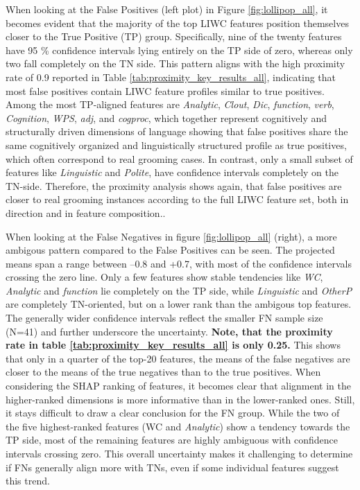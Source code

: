 When looking at the False Positives (left plot) in Figure \ref{fig:lollipop_all}, it becomes evident that the majority of the top LIWC features position themselves closer to the True Positive (TP) group. Specifically, nine of the twenty features have 95 \% confidence intervals lying entirely on the TP side of zero, whereas only two fall completely on the TN side. This pattern aligns with the high proximity rate of 0.9 reported in Table \ref{tab:proximity_key_results_all}, indicating that most false positives contain LIWC feature profiles similar to true positives. Among the most TP-aligned features are \textit{Analytic}, \textit{Clout}, \textit{Dic}, \textit{function}, \textit{verb}, \textit{Cognition}, \textit{WPS}, \textit{adj}, and \textit{cogproc}, which together represent cognitively and structurally driven dimensions of language showing that false positives share the same cognitively organized and linguistically structured profile as true positives, which often correspond to real grooming cases. In contrast, only a small subset of features like \textit{Linguistic} and \textit{Polite}, have confidence intervals completely on the TN-side. Therefore, the proximity analysis shows again, that false positives are closer to real grooming instances according to the full LIWC feature set, both in direction and in feature composition..

When looking at the False Negatives in figure \ref{fig:lollipop_all} (right), a more ambigous pattern  compared to the False Positives can be seen. The projected means span a range between –0.8 and +0.7, with most of the confidence intervals crossing the zero line. Only a few features show stable tendencies like \textit{WC},  \textit{Analytic} and \textit{function} lie completely on the TP side, while \textit{Linguistic} and \textit{OtherP} are completely TN-oriented, but on a lower rank than the ambigous top features. The generally wider confidence intervals reflect the smaller FN sample size (N=41) and further underscore the uncertainty. \textbf{Note, that the proximity rate in table \ref{tab:proximity_key_results_all} is only 0.25.} This shows that only in a quarter of the top-20 features, the means of the false negatives are closer to the means of the true negatives than to the true positives. When considering the SHAP ranking of features, it becomes clear that alignment in the higher-ranked dimensions is more informative than in the lower-ranked ones. Still, it stays difficult to draw a clear conclusion for the FN group. While the two of the five highest-ranked features ({WC} and \textit{Analytic}) show a tendency towards the TP side, most of the remaining features are highly ambiguous with confidence intervals crossing zero. This overall uncertainty makes it challenging to determine if FNs generally align more with TNs, even if some individual features suggest this trend.

